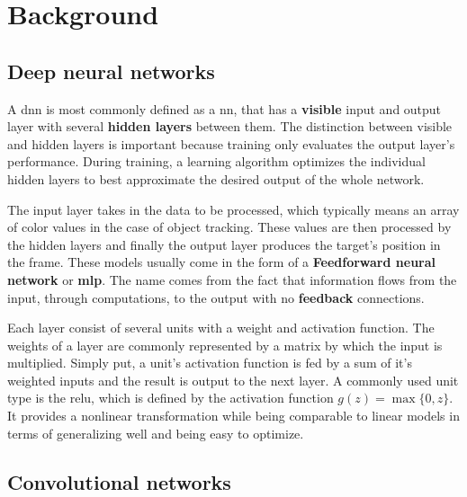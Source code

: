 \section{Background}

\subsection{Deep neural networks}

A \ac{dnn} is most commonly defined as a \ac{nn}, that has a \textbf{visible} input
and output layer with several \textbf{hidden layers} between them. The distinction
between visible and hidden layers is important because training only evaluates the
output layer's performance. During training, a learning algorithm optimizes the
individual hidden layers to best approximate the desired output of the whole network.

The input layer takes in the data to be processed, which typically means an array
of color values in the case of object tracking. These values are then processed
by the hidden layers and finally the output layer produces the target's position
in the frame. These models usually come in the form of a \textbf{Feedforward neural network}
or \textbf{\ac{mlp}}. The name comes from the fact that information flows from
the input, through computations, to the output with no \textbf{feedback} connections.
\\

Each layer consist of several units with a weight and activation function. The weights
of a layer are commonly represented by a matrix by which the input is multiplied.
Simply put, a unit's activation function is fed by a sum of it's weighted inputs
and the result is output to the next layer. A commonly used unit type is the \ac{relu},
which is defined by the activation function $g (z) = \max\{0,z\}$. It provides a
nonlinear transformation while being comparable to linear models in terms of
generalizing well and being easy to optimize.
\cite{DEEP_LEARNING}
\subsection{Convolutional networks}

